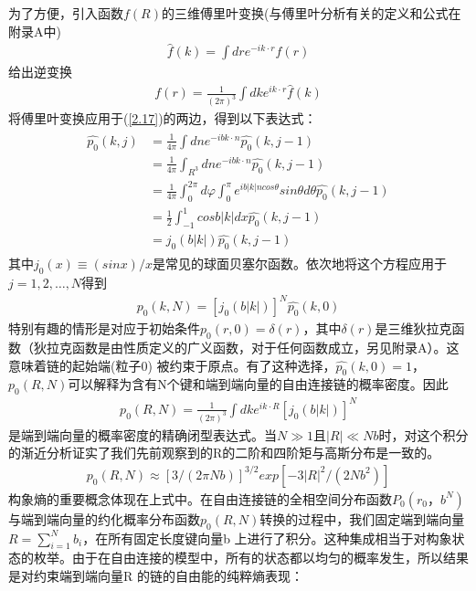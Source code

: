 为了方便，引入函数$f(R)$的三维傅里叶变换(与傅里叶分析有关的定义和公式在附录A中)\\
\begin{gather}
\hat{f}(k)=\int dre^{-ik \cdot r}f(r)
\label{2.18}
\end{gather}
给出逆变换\\
\begin{gather}
 f(r)=\frac{1}{(2 \pi)^3} \int dke^{ik \cdot r} \hat{f}(k)
\label{2.19}
\end{gather}
将傅里叶变换应用于(\ref{2.17})的两边，得到以下表达式：\\
\begin{gather}
\begin{aligned}
\hat{p_0}(k,j)&=\frac{1}{4 \pi} \int dne^{-ibk \cdot n} \hat{p_0}(k,j-1) \\&=\frac{1}{4 \pi} \int _{R^3}dne^{-ibk \cdot n} \hat{p_0}(k,j-1) \\&=
\frac{1}{4 \pi} \int _{0}^{2 \pi}d \varphi \int _{0}^{\pi} e^{ib|k|n cos \theta}sin \theta d \theta \hat{p_0}(k,j-1) \\&=\frac{1}{2} \int _{-1}^{1}cos b|k|dx \hat{p_0}(k,j-1) \\&=j_0(b|k|)\hat{p_0}(k,j-1)
\label{2.20}
\end{aligned}
\end{gather}
其中$j_0(x) \equiv (sinx)/x$是常见的球面贝塞尔函数。依次地将这个方程应用于$j=1,2,\ldots,N$得到\\
\begin{gather}
\hat{p_0}(k,N)=[j_0(b|k|)]^{N}\hat{p_0}(k,0)
\label{2.21}
\end{gather}
特别有趣的情形是对应于初始条件$p_0(r,0)=\delta(r)$，其中$\delta(r)$是三维狄拉克函数（狄拉克函数是由性质定义的广义函数，对于任何函数成立，另见附录A）。这意味着链的起始端(粒子$0$) 被约束于原点。有了这种选择，$\hat{p_0}(k,0)=1$，$p_0(R,N)$可以解释为含有N个键和端到端向量的自由连接链的概率密度。因此\\
\begin{gather}
p_0(R,N)=\frac{1}{(2 \pi)^3 }\int dke^{ik \cdot R}[j_0(b|k|)]^{N}
\label{2.22}
\end{gather}
是端到端向量的概率密度的精确闭型表达式。当$N\gg1$且$|R| \ll Nb $时，对这个积分的渐近分析证实了我们先前观察到的R的二阶和四阶矩与高斯分布是一致的。\\
\begin{gather}
p_0(R,N) \approx [3/(2 \pi Nb)]^{3/2}exp[-3|R|^2/(2Nb^2)]
\label{2.23}
\end{gather}
构象熵的重要概念体现在上式中。在自由连接链的全相空间分布函数$P_0(r_0，b^{N})$与端到端向量的约化概率分布函数$p_0(R,N)$转换的过程中，我们固定端到端向量$R=\sum _{i=1}^{N} b_{i}$，在所有固定长度键向量b 上进行了积分。这种集成相当于对构象状态的枚举。由于在自由连接的模型中，所有的状态都以均匀的概率发生，所以结果是对约束端到端向量R 的链的自由能的纯粹熵表现：\\
